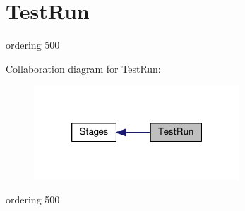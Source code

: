 \hypertarget{group__TestRun}{\section{Test\-Run}
\label{group__TestRun}
}


ordering 500  


Collaboration diagram for Test\-Run\-:
\nopagebreak
\begin{figure}[H]
\begin{center}
\leavevmode
\includegraphics[width=218pt]{group__TestRun}
\end{center}
\end{figure}
ordering 500 